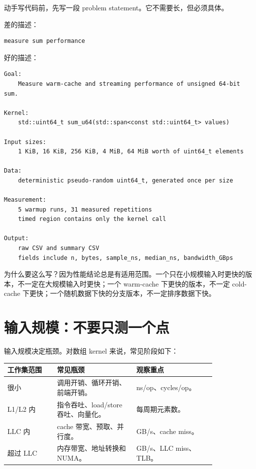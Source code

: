 动手写代码前，先写一段 problem statement。它不需要长，但必须具体。

差的描述：

\begin{lstlisting}
measure sum performance
\end{lstlisting}

好的描述：

\begin{lstlisting}
Goal:
    Measure warm-cache and streaming performance of unsigned 64-bit sum.

Kernel:
    std::uint64_t sum_u64(std::span<const std::uint64_t> values)

Input sizes:
    1 KiB, 16 KiB, 256 KiB, 4 MiB, 64 MiB worth of uint64_t elements

Data:
    deterministic pseudo-random uint64_t, generated once per size

Measurement:
    5 warmup runs, 31 measured repetitions
    timed region contains only the kernel call

Output:
    raw CSV and summary CSV
    fields include n, bytes, sample_ns, median_ns, bandwidth_GBps
\end{lstlisting}

为什么要这么写？因为性能结论总是有适用范围。一个只在小规模输入时更快的版本，不一定在大规模输入时更快；一个 warm-cache 下更快的版本，不一定 cold-cache 下更快；一个随机数据下快的分支版本，不一定排序数据下快。

\section{输入规模：不要只测一个点}

输入规模决定瓶颈。对数组 kernel 来说，常见阶段如下：

\begin{center}
\begin{tabular}{p{0.20\linewidth}p{0.32\linewidth}p{0.32\linewidth}}
\toprule
工作集范围 & 常见瓶颈 & 观察重点 \\
\midrule
很小 & 调用开销、循环开销、前端开销。 & ns/op、cycles/op。 \\
L1/L2 内 & 指令吞吐、load/store 吞吐、向量化。 & 每周期元素数。 \\
LLC 内 & cache 带宽、预取、并行度。 & GB/s、cache miss。 \\
超过 LLC & 内存带宽、地址转换和 NUMA。 & GB/s、LLC miss、TLB。 \\
\bottomrule
\end{tabular}
\end{center}

